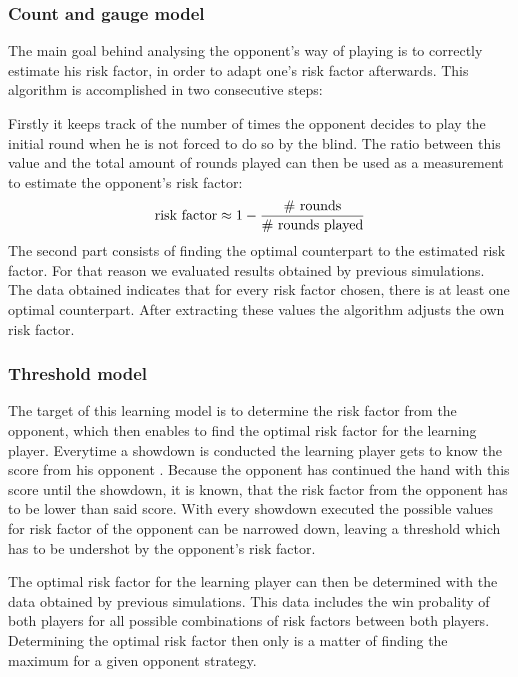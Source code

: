 \documentclass[11pt]{article}
\begin{document}
\subsubsection{Count and gauge model}

The main goal behind analysing the opponent’s way of playing is to correctly estimate his risk factor, in order to adapt one’s risk factor afterwards. 
This algorithm is accomplished in two consecutive steps:
 
Firstly it keeps track of the number of times the opponent decides to play the initial round when he is not forced to do so by the blind. The ratio between this value and the total amount of rounds played can then be used as a measurement to estimate the opponent’s risk factor:
 $$
\textnormal{risk factor} \approx 1 - \dfrac{\textnormal{\# rounds}}{\textnormal{\# rounds played}}
 $$
The second part consists of finding the optimal counterpart to the estimated risk factor. For that reason we evaluated results obtained by previous simulations. The data obtained indicates that for every risk factor chosen, there is at least one optimal counterpart. After extracting these values the algorithm adjusts the own risk factor.

 

\subsubsection{Threshold model}

The target of this learning model is to determine the risk factor from the opponent, which then enables to find the optimal risk factor for the learning player.
Everytime a showdown is conducted the learning player gets to know the score from his opponent . Because the opponent has continued the hand with this score until the showdown, it is known, that the risk factor from the opponent has to be lower than said score. With every showdown executed the possible values for risk factor of the opponent can be narrowed down, leaving a threshold which has to be undershot by the opponent's risk factor.


The optimal risk factor for the learning player can then be determined with the data obtained by previous simulations. This data includes the win probality of both players for all possible combinations of risk factors between both players. Determining the optimal risk factor then only is a matter of finding the maximum for a given opponent strategy.
\end{document}
